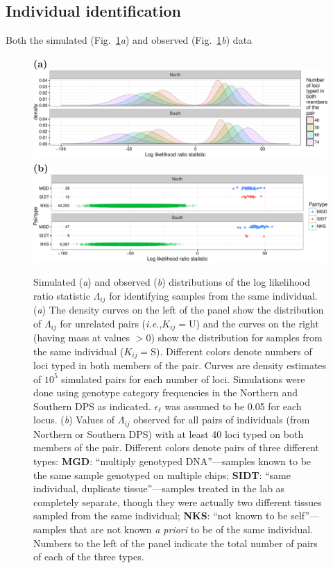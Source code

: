 \documentclass[twocolumn,natbib]{svjour3}       %
\newcommand{\ie}{{\em i.e.},\xspace }
\begin{document}
\subsection{Individual identification}
Both the simulated (Fig.~\ref{fig:self-id}{\em a}) and observed (Fig.~\ref{fig:self-id}{\em b}) data 
\begin{figure}
{\bf (a)}\\
\includegraphics[width = \textwidth]{lambda_densities-crop.pdf}\\
{\bf (b)}\\
\includegraphics[width = \textwidth]{obs-self-id-logls-crop.pdf}
\caption{ Simulated ({\em a}) and observed ({\em b}) distributions of the log likelihood ratio 
statistic $\Lambda_{ij}$ for identifying samples from the same individual.  ({\em a}) The density curves on the 
left of the panel show the distribution of $\Lambda_{ij}$ for unrelated pairs (\ie $K_{ij} = \mathrm{U}$) and the 
curves on the right (having mass at values $>0$) show the distribution for samples from the same individual
($K_{ij} = \mathrm{S}$).  Different colors denote numbers of loci typed in both members of
the pair.  Curves are density estimates of $10^5$ simulated pairs for each number of loci. Simulations were done using
genotype category frequencies in the Northern and Southern DPS as indicated. $\epsilon_\ell$ was assumed to be 0.05 for
each locus. ({\em b}) Values of $\Lambda_{ij}$ observed for all pairs of individuals (from Northern or Southern DPS)
with at least 40 loci typed on both members of the pair. Different colors denote pairs of three different types: {\bf MGD}: 
``multiply genotyped DNA''---samples known to be the same sample genotyped on multiple chips; {\bf SIDT}: ``same
individual, duplicate tissue''---samples treated in the lab as completely separate, 
though they were actually two different tissues sampled from the same individual; 
{\bf NKS}: ``not known to be self''---samples that are not known {\em a priori} to 
be of the same individual. Numbers to the left of the panel indicate the total number of pairs of each of the 
three types.
\label{fig:self-id}}
\end{figure}
\end{document}
